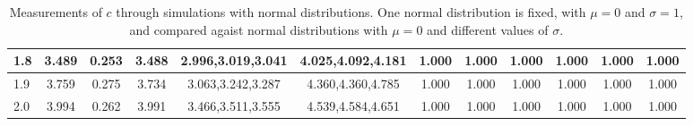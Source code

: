 \begin{table*}[h!]
\begin{center}
\begin{tabular}{| l | c | c | c | c | c | c | c | c | c | c | c |}
1.8 & 3.489 & 0.253 & 3.488 & 2.996,3.019,3.041 & 4.025,4.092,4.181  & 1.000  & 1.000  & 1.000  & 1.000  & 1.000  & 1.000 \\\hline
1.9 & 3.759 & 0.275 & 3.734 & 3.063,3.242,3.287 & 4.360,4.360,4.785  & 1.000  & 1.000  & 1.000  & 1.000  & 1.000  & 1.000 \\\hline
2.0 & 3.994 & 0.262 & 3.991 & 3.466,3.511,3.555 & 4.539,4.584,4.651  & 1.000  & 1.000  & 1.000  & 1.000  & 1.000  & 1.000 \\\hline
\end{tabular}
\caption{Measurements of $c$ through simulations
with normal distributions.
One normal distribution is fixed, with $\mu=0$ and $\sigma=1$,
and compared agaist normal distributions with $\mu=0$
and different values of $\sigma$.}
\end{center}
\end{table*}